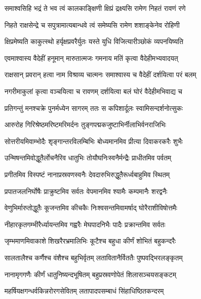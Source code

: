 \twolineshloka
{समाश्वसिहि भद्रं ते भव त्वं कालकाङ्क्षिणी}
{क्षिप्रं द्रक्ष्यसि रामेण निहतं रावणं रणे} %

\twolineshloka
{निहते राक्षसेन्द्रे च सपुत्रामात्यबान्धवे}
{त्वं समेष्यसि रामेण शशाङ्केनेव रोहिणी} %

\twolineshloka
{क्षिप्रमेष्यति काकुत्स्थो हर्यृक्षप्रवरैर्युतः}
{यस्ते युधि विजित्यारीञ्छोकं व्यपनयिष्यति} %

\twolineshloka
{एवमाश्वास्य वैदेहीं हनूमान् मारुतात्मजः}
{गमनाय मतिं कृत्वा वैदेहीमभ्यवादयत्} %

\twolineshloka
{राक्षसान् प्रवरान् हत्वा नाम विश्राव्य चात्मनः}
{समाश्वास्य च वैदेहीं दर्शयित्वा परं बलम्} %

\twolineshloka
{नगरीमाकुलां कृत्वा वञ्चयित्वा च रावणम्}
{दर्शयित्वा बलं घोरं वैदेहीमभिवाद्य च} %

\twolineshloka
{प्रतिगन्तुं मनश्चक्रे पुनर्मध्येन सागरम्}
{ततः स कपिशार्दूलः स्वामिसन्दर्शनोत्सुकः} %

\twolineshloka
{आरुरोह गिरिश्रेष्ठमरिष्टमरिमर्दनः}
{तुङ्गपद्मकजुष्टाभिर्नीलाभिर्वनराजिभिः} %

\twolineshloka
{सोत्तरीयमिवाम्भोदैः शृङ्गान्तरविलम्बिभिः}
{बोध्यमानमिव प्रीत्या दिवाकरकरैः शुभैः} %

\twolineshloka
{उन्मिषन्तमिवोद्धूतैर्लोचनैरिव धातुभिः}
{तोयौघनिःस्वनैर्मन्द्रैः प्राधीतमिव पर्वतम्} %

\twolineshloka
{प्रगीतमिव विस्पष्टं नानाप्रस्रवणस्वनैः}
{देवदारुभिरुद्धूतैरूर्ध्वबाहुमिव स्थितम्} %

\twolineshloka
{प्रपातजलनिर्घोषैः प्राक्रुष्टमिव सर्वतः}
{वेपमानमिव श्यामैः कम्पमानैः शरद्वनैः} %

\twolineshloka
{वेणुभिर्मारुतोद्धूतैः कूजन्तमिव कीचकैः}
{निःश्वसन्तमिवामर्षाद् घोरैराशीविषोत्तमैः} %

\twolineshloka
{नीहारकृतगम्भीरैर्ध्यायन्तमिव गह्वरैः}
{मेघपादनिभैः पादैः प्रक्रान्तमिव सर्वतः} %

\twolineshloka
{जृम्भमाणमिवाकाशे शिखरैरभ्रमालिभिः}
{कूटैश्च बहुधा कीर्णं शोभितं बहुकन्दरैः} %

\twolineshloka
{सालतालैश्च कर्णैश्च वंशैश्च बहुभिर्वृतम्}
{लतावितानैर्विततैः पुष्पवद्भिरलङ्कृतम्} %

\twolineshloka
{नानामृगगणैः कीर्णं धातुनिष्यन्दभूषितम्}
{बहुप्रस्रवणोपेतं शिलासञ्चयसङ्कटम्} %

\twolineshloka
{महर्षियक्षगन्धर्वकिन्नरोरगसेवितम्}
{लतापादपसम्बाधं सिंहाधिष्ठितकन्दरम्} %

